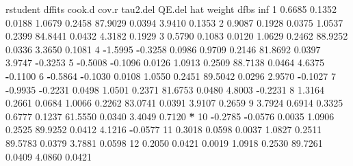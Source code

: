 \documentclass[
]{book}
\newenvironment{Shaded}{\begin{snugshade}}{\end{snugshade}}
\newcommand{\DecValTok}[1]{\textcolor[rgb]{0.00,0.00,0.81}{#1}}
\newcommand{\FloatTok}[1]{\textcolor[rgb]{0.00,0.00,0.81}{#1}}
\newcommand{\NormalTok}[1]{#1}
\newcommand{\SpecialCharTok}[1]{\textcolor[rgb]{0.81,0.36,0.00}{\textbf{#1}}}
\begin{document}
\begin{Shaded}
\begin{Highlighting}[]
\NormalTok{  rstudent  dffits cook.d  cov.r tau2.del  QE.del    hat weight    dfbs inf }
\DecValTok{1}    \FloatTok{0.6685}  \FloatTok{0.1352} \FloatTok{0.0188} \FloatTok{1.0679}   \FloatTok{0.2458} \FloatTok{87.9029} \FloatTok{0.0394} \FloatTok{3.9410}  \FloatTok{0.1353}     
\DecValTok{2}    \FloatTok{0.9087}  \FloatTok{0.1928} \FloatTok{0.0375} \FloatTok{1.0537}   \FloatTok{0.2399} \FloatTok{84.8441} \FloatTok{0.0432} \FloatTok{4.3182}  \FloatTok{0.1929}     
\DecValTok{3}    \FloatTok{0.5790}  \FloatTok{0.1083} \FloatTok{0.0120} \FloatTok{1.0629}   \FloatTok{0.2462} \FloatTok{88.9252} \FloatTok{0.0336} \FloatTok{3.3650}  \FloatTok{0.1081}     
\DecValTok{4}   \SpecialCharTok{{-}}\FloatTok{1.5995} \SpecialCharTok{{-}}\FloatTok{0.3258} \FloatTok{0.0986} \FloatTok{0.9709}   \FloatTok{0.2146} \FloatTok{81.8692} \FloatTok{0.0397} \FloatTok{3.9747} \SpecialCharTok{{-}}\FloatTok{0.3253}     
\DecValTok{5}   \SpecialCharTok{{-}}\FloatTok{0.5008} \SpecialCharTok{{-}}\FloatTok{0.1096} \FloatTok{0.0126} \FloatTok{1.0913}   \FloatTok{0.2509} \FloatTok{88.7138} \FloatTok{0.0464} \FloatTok{4.6375} \SpecialCharTok{{-}}\FloatTok{0.1100}     
\DecValTok{6}   \SpecialCharTok{{-}}\FloatTok{0.5864} \SpecialCharTok{{-}}\FloatTok{0.1030} \FloatTok{0.0108} \FloatTok{1.0550}   \FloatTok{0.2451} \FloatTok{89.5042} \FloatTok{0.0296} \FloatTok{2.9570} \SpecialCharTok{{-}}\FloatTok{0.1027}     
\DecValTok{7}   \SpecialCharTok{{-}}\FloatTok{0.9935} \SpecialCharTok{{-}}\FloatTok{0.2231} \FloatTok{0.0498} \FloatTok{1.0501}   \FloatTok{0.2371} \FloatTok{81.6753} \FloatTok{0.0480} \FloatTok{4.8003} \SpecialCharTok{{-}}\FloatTok{0.2231}     
\DecValTok{8}    \FloatTok{1.3164}  \FloatTok{0.2661} \FloatTok{0.0684} \FloatTok{1.0066}   \FloatTok{0.2262} \FloatTok{83.0741} \FloatTok{0.0391} \FloatTok{3.9107}  \FloatTok{0.2659}     
\DecValTok{9}    \FloatTok{3.7924}  \FloatTok{0.6914} \FloatTok{0.3325} \FloatTok{0.6777}   \FloatTok{0.1237} \FloatTok{61.5550} \FloatTok{0.0340} \FloatTok{3.4049}  \FloatTok{0.7120}   \SpecialCharTok{*} 
\DecValTok{10}  \SpecialCharTok{{-}}\FloatTok{0.2785} \SpecialCharTok{{-}}\FloatTok{0.0576} \FloatTok{0.0035} \FloatTok{1.0906}   \FloatTok{0.2525} \FloatTok{89.9252} \FloatTok{0.0412} \FloatTok{4.1216} \SpecialCharTok{{-}}\FloatTok{0.0577}     
\DecValTok{11}   \FloatTok{0.3018}  \FloatTok{0.0598} \FloatTok{0.0037} \FloatTok{1.0827}   \FloatTok{0.2511} \FloatTok{89.5783} \FloatTok{0.0379} \FloatTok{3.7881}  \FloatTok{0.0598}     
\DecValTok{12}   \FloatTok{0.2050}  \FloatTok{0.0421} \FloatTok{0.0019} \FloatTok{1.0918}   \FloatTok{0.2530} \FloatTok{89.7261} \FloatTok{0.0409} \FloatTok{4.0860}  \FloatTok{0.0421}     

\end{Highlighting}
\end{Shaded}
\end{document}
